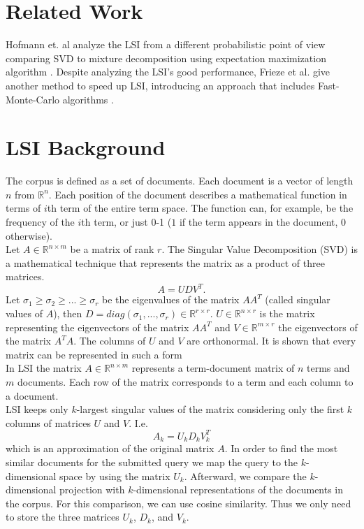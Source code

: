 \documentclass[a4paper,11pt,DIV=15]{scrartcl} %
\theoremstyle{plain}
\theoremstyle{definition}
\begin{document}
\section{Related Work}
Hofmann et. al analyze the LSI from a different probabilistic point of view comparing SVD to mixture decomposition using expectation maximization algorithm \cite{Relatedwork1}.
Despite analyzing the LSI's good performance, Frieze et al. give another method to speed up LSI, introducing an approach that includes Fast-Monte-Carlo algorithms \cite{Relatedwork2}.





 

\section{LSI Background} %
The corpus is defined as a set of documents. Each document is a vector of length $n$ from $\mathbb{R}^n$. Each position of the document describes a mathematical function in terms of $i$th term of the entire term space. The function can, for example, be the frequency of the $i$th term, or just 0-1 ($1$ if the term appears in the document, $0$ otherwise).\\
Let $A \in \mathbb{R}^{n \times m}$ be a matrix of rank $r$. The Singular Value Decomposition (SVD) is a mathematical technique that represents the matrix as a product of three matrices.
\[
A = UDV^T.
\]
Let $\sigma_1 \geq \sigma_2 \geq ...\geq \sigma_r$ be the eigenvalues of the matrix $AA^T$ (called singular values of $A$), then $D = diag(\sigma_1,...,\sigma_r) \in \mathbb{R}^{r \times r}$. $U \in \mathbb{R}^{n \times r}$ is the matrix representing the eigenvectors of the matrix $AA^T$ and $V \in \mathbb{R}^{m \times r}$ the eigenvectors of the matrix $A^TA$. The columns of $U$ and $V$ are orthonormal. It is shown that every matrix can be represented in such a form \cite{strang2005}\\
In LSI the matrix $A \in \mathbb{R}^{n \times m}$ represents a term-document matrix of $n$ terms and $m$ documents. Each row of the matrix corresponds to a term and each column to a document.\\
LSI keeps only $k$-largest singular values of the matrix considering only the first $k$ columns of matrices $U$ and $V$. I.e.
\[
A_k = U_kD_kV_k^T
\]
which is an approximation of the original matrix $A$. 
In order to find the most similar documents for the submitted query we map the query to the $k$-dimensional space by using the matrix $U_k$. Afterward, we compare the $k$-dimensional projection with $k$-dimensional representations of the documents in the corpus. For this comparison, we can use cosine similarity. Thus we only need to store the three matrices $U_k$, $D_k$, and $V_k$.
\end{document}
